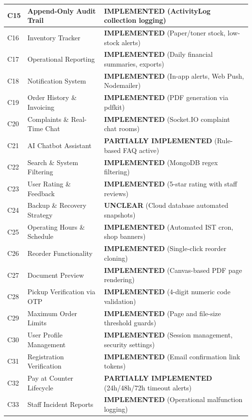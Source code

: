 \documentclass[12pt,a4paper,oneside]{report}
\begin{document}
\begin{table}[H]
\begin{tabularx}{\textwidth}{|p{0.55in}|p{1.9in}|X|}
C15 & Append-Only Audit Trail & \textbf{IMPLEMENTED} (ActivityLog collection logging) \\ \hline
C16 & Inventory Tracker & \textbf{IMPLEMENTED} (Paper/toner stock, low-stock alerts) \\ \hline
C17 & Operational Reporting & \textbf{IMPLEMENTED} (Daily financial summaries, exports) \\ \hline
C18 & Notification System & \textbf{IMPLEMENTED} (In-app alerts, Web Push, Nodemailer) \\ \hline
C19 & Order History \& Invoicing & \textbf{IMPLEMENTED} (PDF generation via pdfkit) \\ \hline
C20 & Complaints \& Real-Time Chat & \textbf{IMPLEMENTED} (Socket.IO complaint chat rooms) \\ \hline
C21 & AI Chatbot Assistant & \textbf{PARTIALLY IMPLEMENTED} (Rule-based FAQ active) \\ \hline
C22 & Search \& System Filtering & \textbf{IMPLEMENTED} (MongoDB regex filtering) \\ \hline
C23 & User Rating \& Feedback & \textbf{IMPLEMENTED} (5-star rating with staff reviews) \\ \hline
C24 & Backup \& Recovery Strategy & \textbf{UNCLEAR} (Cloud database automated snapshots) \\ \hline
C25 & Operating Hours \& Schedule & \textbf{IMPLEMENTED} (Automated IST cron, shop banners) \\ \hline
C26 & Reorder Functionality & \textbf{IMPLEMENTED} (Single-click reorder cloning) \\ \hline
C27 & Document Preview & \textbf{IMPLEMENTED} (Canvas-based PDF page rendering) \\ \hline
C28 & Pickup Verification via OTP & \textbf{IMPLEMENTED} (4-digit numeric code validation) \\ \hline
C29 & Maximum Order Limits & \textbf{IMPLEMENTED} (Page and file-size threshold guards) \\ \hline
C30 & User Profile Management & \textbf{IMPLEMENTED} (Session management, security settings) \\ \hline
C31 & Registration Verification & \textbf{IMPLEMENTED} (Email confirmation link tokens) \\ \hline
C32 & Pay at Counter Lifecycle & \textbf{PARTIALLY IMPLEMENTED} (24h/48h/72h timeout alerts) \\ \hline
C33 & Staff Incident Reports & \textbf{IMPLEMENTED} (Operational malfunction logging) \\ \hline

\end{tabularx}
\end{table}
\end{document}
